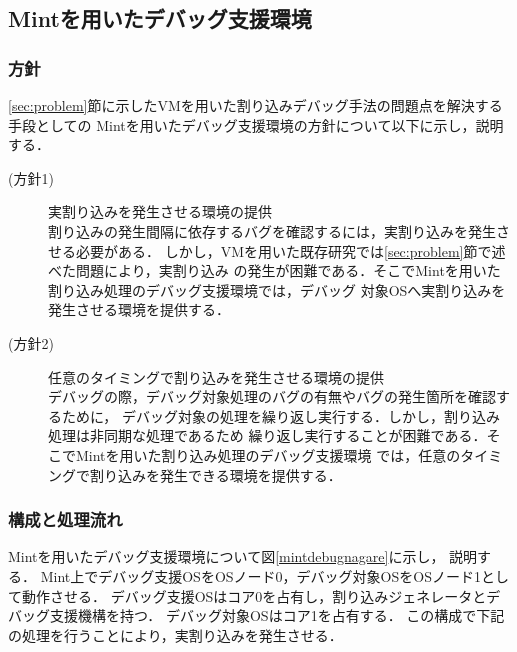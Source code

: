 \documentclass[submit,techreq,noauthor,dvipdfmx]{ipsj}
\begin{document}
\subsection{Mintを用いたデバッグ支援環境}\label{sec:debugging_support_mechanism_with_Mint}

\subsubsection{方針}\label{sec:policy}

\ref{sec:problem}節に示したVMを用いた割り込みデバッグ手法の問題点を解決する手段としての
Mintを用いたデバッグ支援環境の方針について以下に示し，説明する．
\begin{description}
    \item[(方針1)] 実割り込みを発生させる環境の提供\\
        割り込みの発生間隔に依存するバグを確認するには，実割り込みを発生させる必要がある．
        しかし，VMを用いた既存研究では\ref{sec:problem}節で述べた問題により，実割り込み
        の発生が困難である．そこでMintを用いた割り込み処理のデバッグ支援環境では，デバッグ
        対象OSへ実割り込みを発生させる環境を提供する．
    \item[(方針2)] 任意のタイミングで割り込みを発生させる環境の提供\\
        デバッグの際，デバッグ対象処理のバグの有無やバグの発生箇所を確認するために，
        デバッグ対象の処理を繰り返し実行する．しかし，割り込み処理は非同期な処理であるため
        繰り返し実行することが困難である．そこでMintを用いた割り込み処理のデバッグ支援環境
        では，任意のタイミングで割り込みを発生できる環境を提供する．
\end{description}

\subsubsection{構成と処理流れ}\label{sec:structure_and_processing_flow}


Mintを用いたデバッグ支援環境について図\ref{mintdebugnagare}に示し，
説明する．
Mint上でデバッグ支援OSをOSノード0，デバッグ対象OSをOSノード1として動作させる．
デバッグ支援OSはコア0を占有し，割り込みジェネレータとデバッグ支援機構を持つ．
デバッグ対象OSはコア1を占有する．
この構成で下記の処理を行うことにより，実割り込みを発生させる．
\end{document}
